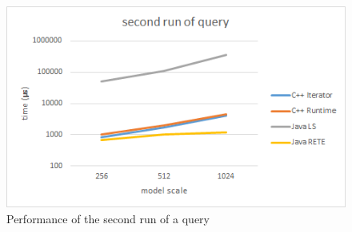 \begin{figure}[!ht]
\centering
\includegraphics[width=120mm,
keepaspectratio]{figures/meas_second_run.png}
\caption{Performance of the second run of a query}
\label{fig:meas_second_run}
\end{figure}